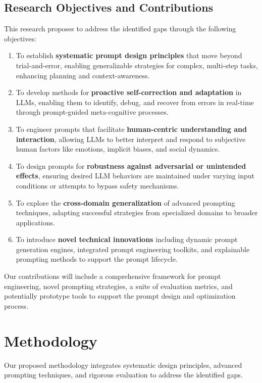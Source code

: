 \documentclass{article}
\begin{document}
\subsection{Research Objectives and Contributions}
This research proposes to address the identified gaps through the following objectives:
\begin{enumerate}[noitemsep]
    \item To establish \textbf{systematic prompt design principles} that move beyond trial-and-error, enabling generalizable strategies for complex, multi-step tasks, enhancing planning and context-awareness.
    \item To develop methods for \textbf{proactive self-correction and adaptation} in LLMs, enabling them to identify, debug, and recover from errors in real-time through prompt-guided meta-cognitive processes.
    \item To engineer prompts that facilitate \textbf{human-centric understanding and interaction}, allowing LLMs to better interpret and respond to subjective human factors like emotions, implicit biases, and social dynamics.
    \item To design prompts for \textbf{robustness against adversarial or unintended effects}, ensuring desired LLM behaviors are maintained under varying input conditions or attempts to bypass safety mechanisms.
    \item To explore the \textbf{cross-domain generalization} of advanced prompting techniques, adapting successful strategies from specialized domains to broader applications.
    \item To introduce \textbf{novel technical innovations} including dynamic prompt generation engines, integrated prompt engineering toolkits, and explainable prompting methods to support the prompt lifecycle.
\end{enumerate}
Our contributions will include a comprehensive framework for prompt engineering, novel prompting strategies, a suite of evaluation metrics, and potentially prototype tools to support the prompt design and optimization process.

\section{Methodology}
Our proposed methodology integrates systematic design principles, advanced prompting techniques, and rigorous evaluation to address the identified gaps.
\end{document}
